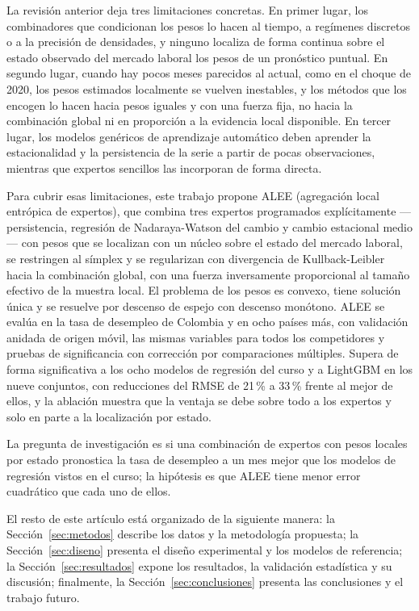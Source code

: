 \documentclass[11pt]{article}
\begin{document}
La revisión anterior deja tres limitaciones concretas. En primer lugar, los combinadores que condicionan los pesos lo hacen al tiempo, a regímenes discretos o a la precisión de densidades, y ninguno localiza de forma continua sobre el estado observado del mercado laboral los pesos de un pronóstico puntual. En segundo lugar, cuando hay pocos meses parecidos al actual, como en el choque de 2020, los pesos estimados localmente se vuelven inestables, y los métodos que los encogen lo hacen hacia pesos iguales y con una fuerza fija, no hacia la combinación global ni en proporción a la evidencia local disponible. En tercer lugar, los modelos genéricos de aprendizaje automático deben aprender la estacionalidad y la persistencia de la serie a partir de pocas observaciones, mientras que expertos sencillos las incorporan de forma directa.

Para cubrir esas limitaciones, este trabajo propone ALEE (agregación local entrópica de expertos), que combina tres expertos programados explícitamente ---persistencia, regresión de Nadaraya-Watson del cambio y cambio estacional medio--- con pesos que se localizan con un núcleo sobre el estado del mercado laboral, se restringen al símplex y se regularizan con divergencia de Kullback-Leibler hacia la combinación global, con una fuerza inversamente proporcional al tamaño efectivo de la muestra local. El problema de los pesos es convexo, tiene solución única y se resuelve por descenso de espejo con descenso monótono. ALEE se evalúa en la tasa de desempleo de Colombia y en ocho países más, con validación anidada de origen móvil, las mismas variables para todos los competidores y pruebas de significancia con corrección por comparaciones múltiples. Supera de forma significativa a los ocho modelos de regresión del curso y a LightGBM en los nueve conjuntos, con reducciones del RMSE de 21\,\% a 33\,\% frente al mejor de ellos, y la ablación muestra que la ventaja se debe sobre todo a los expertos y solo en parte a la localización por estado.

La pregunta de investigación es si una combinación de expertos con pesos locales por estado pronostica la tasa de desempleo a un mes mejor que los modelos de regresión vistos en el curso; la hipótesis es que ALEE tiene menor error cuadrático que cada uno de ellos.

El resto de este artículo está organizado de la siguiente manera: la Sección~\ref{sec:metodos} describe los datos y la metodología propuesta; la Sección~\ref{sec:diseno} presenta el diseño experimental y los modelos de referencia; la Sección~\ref{sec:resultados} expone los resultados, la validación estadística y su discusión; finalmente, la Sección~\ref{sec:conclusiones} presenta las conclusiones y el trabajo futuro.
\end{document}

